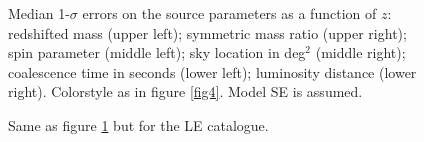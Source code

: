 \documentclass{iopart}
\begin{document}
\begin{figure}
\caption{Median 1-$\sigma$ errors on the source parameters as a function of 
$z$: redshifted mass (upper left); symmetric mass ratio (upper right); spin parameter (middle left); sky location in deg$^2$ (middle right); coalescence time in seconds (lower left); luminosity distance (lower right). Colorstyle as in figure \ref{fig4}. Model SE is assumed.
\label{MedianErrs_SE_LISAC1C2} } 
\end{figure}



\begin{figure}
\caption{Same as figure \ref{MedianErrs_SE_LISAC1C2} but for the LE catalogue.
\label{MedianSNR_LE_LISAC1C2} } 
\end{figure}
\end{document}
